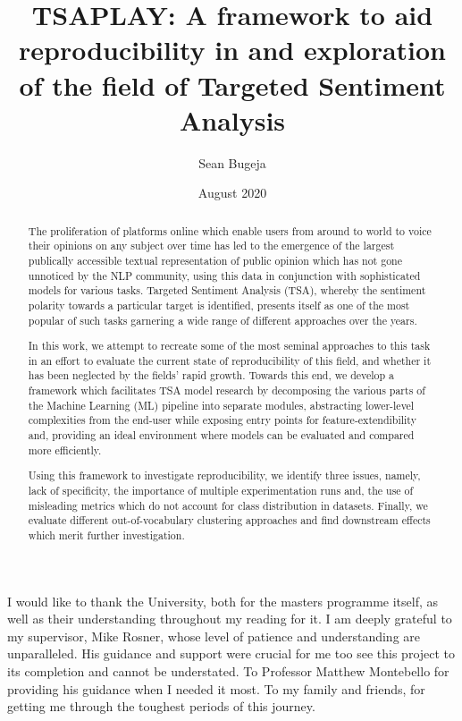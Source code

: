 \documentclass[12pt, a4paper]{report}
\theoremstyle{definition}
\theoremstyle{definition}%
\theoremstyle{definition}%
\theoremstyle{definition}%
\theoremstyle{definition}%
\theoremstyle{definition}%
\begin{document}
\title{TSAPLAY: A framework to aid reproducibility in and exploration of the field of Targeted Sentiment Analysis}
\author{Sean Bugeja}
\date{August 2020}

\frontmatter


\begin{acknowledgements}
I would like to thank the University, both for the masters programme itself, as well as their understanding throughout my reading for it. 
I am deeply grateful to my supervisor, Mike Rosner, whose level of patience and understanding are unparalleled. His guidance and support were crucial for me too see this project to its completion and cannot be understated. To Professor Matthew Montebello for providing his guidance when I needed it most. To my family and friends, for getting me through the toughest periods of this journey.  
\end{acknowledgements}

\begin{abstract}
	The proliferation of platforms online which enable users from around to world to voice their opinions on any subject over time has led to the emergence of the largest publically accessible textual representation of public opinion which has not gone unnoticed by the NLP community, using this data in conjunction with sophisticated models for various tasks. Targeted Sentiment Analysis (TSA), whereby the sentiment polarity towards a particular target is identified, presents itself as one of the most popular of such tasks garnering a wide range of different approaches over the years.

	In this work, we attempt to recreate some of the most seminal approaches to this task in an effort to evaluate the current state of reproducibility of this field, and whether it has been neglected by the fields' rapid growth. Towards this end, we develop a framework which facilitates TSA model research by decomposing the various parts of the Machine Learning (ML) pipeline into separate modules, abstracting lower-level complexities from the end-user while exposing entry points for feature-extendibility and, providing an ideal environment where models can be evaluated and compared more efficiently.

	Using this framework to investigate reproducibility, we identify three issues, namely, lack of specificity, the importance of multiple experimentation runs and, the use of misleading metrics which do not account for class distribution in datasets. Finally, we evaluate different out-of-vocabulary clustering approaches and find downstream effects which merit further investigation. 
\end{abstract}
\end{document}
